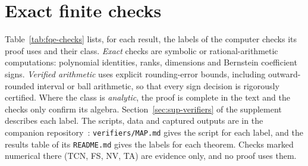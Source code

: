 \section{Exact finite checks}\label{sec:fqe-verifiers}
Table~\ref{tab:fqe-checks} lists, for each result, the labels of the computer checks its proof uses and their class.
\emph{Exact} checks are symbolic or rational-arithmetic computations: polynomial identities, ranks, dimensions and
Bernstein coefficient signs. \emph{Verified arithmetic} uses explicit rounding-error bounds, including outward-rounded interval or ball arithmetic, so that every
sign decision is rigorously certified. Where the class is \emph{analytic}, the proof is complete in the text and the
checks only confirm its algebra. Section~\ref{sec:sup-verifiers} of the supplement describes each label. The scripts, data
and captured outputs are in the companion repository~\cite{Companion}: \texttt{verifiers/MAP.md} gives the script for each label,
and the results table of its \texttt{README.md} gives the labels for each theorem. Checks marked numerical there (TCN, FS,
NV, TA) are evidence only, and no proof uses them.

